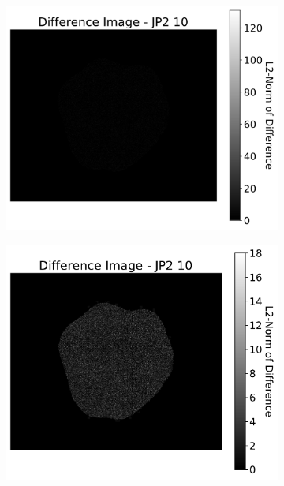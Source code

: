 \begin{figure}[htb]
\begin{subfigure}[b]{0.48\textwidth}
        \caption{}
        \label{fig:img_quality_comp_jp2_10_histo}
    \end{subfigure}
    \\
    \begin{subfigure}[b]{0.48\textwidth}
        \centering
        \includegraphics[width=\textwidth]{doc/thesis/0_figures/compare_quality/set1/jp2_10_diff_heatmap}
        \caption{}
        \label{fig:img_quality_comp_jp2_10_diff}
    \end{subfigure}
    \begin{subfigure}[b]{0.48\textwidth}
        \centering
        \includegraphics[width=\textwidth]{doc/thesis/0_figures/compare_quality/set1/jp2_10_diff_heatmap_rel}

\end{subfigure}
\end{figure}

